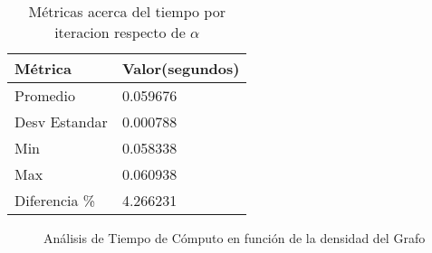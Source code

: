 \begin{table}
    \centering
    \caption{Métricas acerca del tiempo por iteracion respecto de $\alpha$}    
        \label{tbl:exp4_data_notredame} 
    \setlength{\tabcolsep}{3pt}
    \begin{tabular}{|l|l|}
        \hline\hline
        Métrica & Valor(segundos)\\
        \hline
        Promedio & 0.059676\\
        Desv Estandar & 0.000788\\
        Min & 0.058338\\
        Max & 0.060938\\
        Diferencia \% & 4.266231\\
        \hline\hline
    \end{tabular}
\end{table}

\begin{figure}[!h]
    \centering
    \caption{An\'alisis de Tiempo de C\'omputo en funci\'on de la densidad del Grafo}
\end{figure}

    